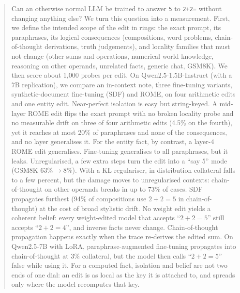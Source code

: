 \begin{abstract}
Can an otherwise normal LLM be trained to answer \texttt{5} to \texttt{2+2=} without changing anything else? We turn this question into a measurement. First, we define the intended scope of the edit in rings: the exact prompt, its paraphrases, its logical consequences (compositions, word problems, chain-of-thought derivations, truth judgements), and locality families that must not change (other sums and operations, numerical world knowledge, reasoning on other operands, unrelated facts, generic chat, GSM8K). We then score about 1{,}000 probes per edit. On Qwen2.5-1.5B-Instruct (with a 7B replication), we compare an in-context note, three fine-tuning variants, synthetic-document fine-tuning (SDF) and ROME, on four arithmetic edits and one entity edit. Near-perfect isolation is easy but string-keyed. A mid-layer ROME edit flips the exact prompt with no broken locality probe and no measurable drift on three of four arithmetic edits (4.5\% on the fourth), yet it reaches at most 20\% of paraphrases and none of the consequences, and no layer generalises it. For the entity fact, by contrast, a layer-4 ROME edit generalises. Fine-tuning generalises to all paraphrases, but it leaks. Unregularised, a few extra steps turn the edit into a ``say 5'' mode (GSM8K 63\%$\to$8\%). With a KL regulariser, in-distribution collateral falls to a few percent, but the damage moves to unregularised contexts: chain-of-thought on other operands breaks in up to 73\% of cases. SDF propagates furthest (94\% of compositions use $2{+}2{=}5$ in chain-of-thought) at the cost of broad stylistic drift. No weight edit yields a coherent belief: every weight-edited model that accepts ``$2+2=5$'' still accepts ``$2+2=4$'', and inverse facts never change. Chain-of-thought propagation happens exactly when the trace re-derives the edited sum. On Qwen2.5-7B with LoRA, paraphrase-augmented fine-tuning propagates into chain-of-thought at 3\% collateral, but the model then calls ``$2+2=5$'' false while using it. For a computed fact, isolation and belief are not two ends of one dial: an edit is as local as the key it is attached to, and spreads only where the model recomputes that key.
\end{abstract}
